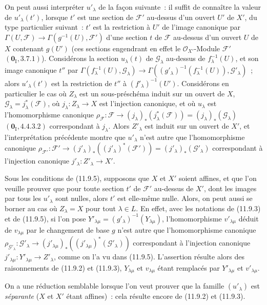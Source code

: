 \begin{env}[11.9.5]
On peut aussi interpréter $u'_\lambda$ de la façon suivante~: il suffit de
connaître la valeur de $u'_\lambda(t')$, lorsque $t'$ est une section de
$\mathcal F'$ au-dessus d'un ouvert $U'$ de $X'$, du type particulier
suivant~: $t'$ est la restriction à $U'$ de l'image canonique par
$\Gamma(U,\mathcal F)\to\Gamma(g^{-1}(U),\mathcal F')$ d'une section $t$ de
$\mathcal F$ au-dessus d'un ouvert $U$ de $X$ contenant $g(U')$ (ces sections
engendrant en effet le $\mathcal O_{X'}$-Module $\mathcal F'$
$(\mathbf 0_{\mathrm I},3.7.1)$). Considérons la section $u_\lambda(t)$ de
$\mathcal G_\lambda$ au-dessus de $f_\lambda^{-1}(U)$, et son image canonique
$t''$ par
$\Gamma(f_\lambda^{-1}(U),\mathcal G_\lambda)\to
\Gamma((g'_\lambda)^{-1}(f_\lambda^{-1}(U)),\mathcal G'_\lambda)$~; alors
$u'_\lambda(t')$ est la restriction de $t''$ à $(f'_\lambda)^{-1}(U')$.
Considérons en particulier le cas où $Z_\lambda$ est un sous-préschéma induit
sur un ouvert de $X$, $\mathcal G_\lambda=j_\lambda^*(\mathcal F)$, où
$j_\lambda:Z_\lambda\to X$ est l'injection canonique, et où $u_\lambda$ est
l'homomorphisme canonique
$\rho_{\mathcal F}:\mathcal F\to(j_\lambda)_*(j_\lambda^*(\mathcal F))
=(j_\lambda)_*(\mathcal G_\lambda)$ $(\mathbf 0_{\mathrm I},4.4.3.2)$
correspondant à $j_\lambda$. Alors $Z'_\lambda$ est induit sur un ouvert de
$X'$, et l'interprétation précédente montre que $u'_\lambda$ n'est autre que
l'homomorphisme canonique
$\rho_{\mathcal F'}:\mathcal F'\to
(j'_\lambda)_*((j'_\lambda)^*(\mathcal F'))
=(j'_\lambda)_*(\mathcal G'_\lambda)$ correspondant à l'injection canonique
$j'_\lambda:Z'_\lambda\to X'$.
\end{env}

\begin{env}[11.9.6]
\label{IV.11.9.6-fr}
Sous les conditions de (11.9.5), supposons que $X$ et $X'$ soient affines, et
que l'on veuille prouver que pour toute section $t'$ de $\mathcal F'$ au-dessus
de $X'$, dont les images par tous les $u'_\lambda$ sont nulles, alors $t'$ est
elle-même nulle. Alors, on peut aussi se borner au cas où $Z_\lambda=X$ pour
tout $\lambda\in L$. En effet, avec les notations de (11.9.3) et de (11.9.5),
si l'on pose $Y'_{\lambda\mu}=(g'_\lambda)^{-1}(Y_{\lambda\mu})$,
l'homomorphisme $v'_{\lambda\mu}$ déduit de $v_{\lambda\mu}$ par le changement
de base $g$ n'est autre que l'homomorphisme canonique
$\rho_{\mathcal G'_\lambda}:\mathcal G'_\lambda\to
(j'_{\lambda\mu})_*((j'_{\lambda\mu})^*(\mathcal G'_\lambda))$
correspondant à l'injection canonique
$j'_{\lambda\mu}:Y'_{\lambda\mu}\to Z'_\lambda$, comme on l'a vu dans
(11.9.5). L'assertion résulte alors des raisonnements de (11.9.2) et (11.9.3),
$Y_{\lambda\mu}$ et $v_{\lambda\mu}$ étant remplacés par
$Y'_{\lambda\mu}$ et $v'_{\lambda\mu}$.

On a une réduction semblable lorsque l'on veut prouver que la famille
$(u'_\lambda)$ est \emph{séparante} ($X$ et $X'$ étant affines)~: cela résulte
encore de (11.9.2) et (11.9.3).
\end{env}

